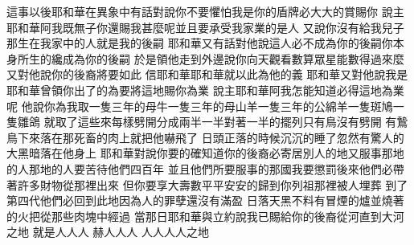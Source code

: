 \bchapter%
這事以後\chientien 耶和華在異象中有話對說\chientien {}你不要懼怕\chientien 我是你的盾牌\chientien 必大大的賞賜你\chuan 
{}說\chientien 主耶和華阿\chientien 我既無子\chientien 你還賜我甚麼呢\yuentien 並且要承受我家業的\chientien 是人\chuan 
{}又說\chientien 你沒有給我兒子\chientien 那生在我家中的人\chientien 就是我的後嗣\chuan 
{}耶和華又有話對他說\chientien 這人必不成為你的後嗣\chientien 你本身所生的\chientien 纔成為你的後嗣\chuan 
{}於是領他走到外邊\chientien 說\chientien 你向天觀看\chientien 數算眾星\chientien 能數得過來麼\yuentien 又對他說\chientien 你的後裔將要如此\chuan 
{}信耶和華\chientien 耶和華就以此為他的義\chuan 
{}耶和華又對他說\chientien 我是耶和華\chientien 曾領你出了的\chientien 為要將這地賜你為業\chuan 
{}說\chientien 主耶和華阿\chientien 我怎能知道必得這地為業呢\chuan 
{}他說\chientien 你為我取一隻三年的母牛\chientien 一隻三年的母山羊\chientien 一隻三年的公綿羊\chientien 一隻斑鳩\chientien 一隻雛鴿\chuan 
{}就取了這些來\chientien 每樣劈開分成兩半\chientien 一半對著一半的擺列\chientien 只有鳥沒有劈開\chuan 
{}有鷙鳥下來落在那死畜的肉上\chientien{}就把他嚇飛了\chuan\Chuan
{}日頭正落的時候\chientien{}沉沉的睡了\yuentien 忽然有驚人的大黑暗落在他身上\chuan 
{}耶和華對說\chientien 你要的確知道\chientien 你的後裔必寄居別人的地\chientien 又服事那地的人\yuentien 那地的人要苦待他們四百年\yuentien 
{}並且他們所要服事的那國\chientien 我要懲罰後來他們必帶著許多財物\chientien 從那裡出來\chuan 
{}但你要享大壽數\chientien 平平安安的歸到你列祖那裡\chientien 被人埋葬\chuan 
{}到了第四代\chientien 他們必回到此地\chientien 因為人的罪孽\chientien 還沒有滿盈\chuan 
{}日落天黑\chientien 不料有冒煙的爐\chientien 並燒著的火把\chientien 從那些肉塊中經過\chuan 
{}當那日耶和華與立約\chientien 說\chientien 我已賜給你的後裔\chientien 從河直到大河之地\yuentien 
{}就是人\chientien{}人\chientien{}人\chientien 
{}赫人\chientien{}人\chientien{}人\chientien 
{}人\chientien{}人\chientien{}人\chientien{}人\chientien 之地\chuan 

